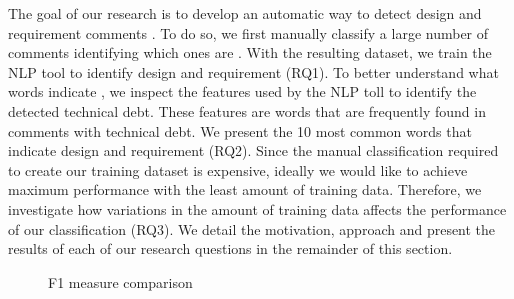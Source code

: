The goal of our research is to develop an automatic way to detect design and requirement \SATD comments . To do so, we first manually classify a large number of comments identifying which ones are \SATD. With the resulting dataset, we train the NLP tool to identify design and requirement \SATD (RQ1). To better understand what words indicate \SATD, we inspect the features used by the NLP toll to identify the detected technical debt. These features are words that are frequently found in comments with technical debt. We present the 10 most common words that indicate design and requirement \SATD (RQ2). Since the manual classification required to create our training dataset is expensive, ideally we would like to achieve maximum performance with the least amount of training data. Therefore, we investigate how variations in the amount of training data affects the performance of our classification (RQ3). We detail the motivation, approach and present the results of each of our research questions in the remainder of this section.    

\begin{figure}[!thb]
  \centering
  \caption{F1 measure comparison}
\end{figure}

